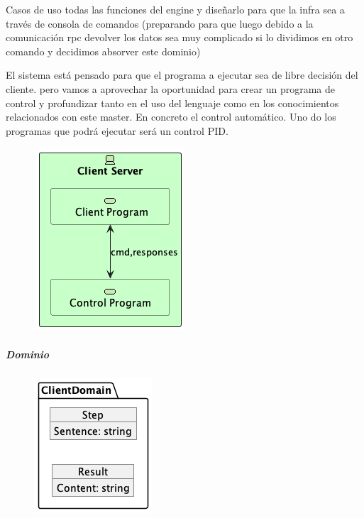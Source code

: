 Casos de uso todas las funciones del engine y diseñarlo para que la infra sea a través de consola de comandos (preparando para que luego debido a la comunicación rpc devolver los datos sea muy complicado si lo dividimos en otro comando y decidimos absorver este dominio)

El sistema está pensado para que el programa a ejecutar sea de libre decisión del cliente. pero vamos a aprovechar la oportunidad para crear un programa de control y profundizar tanto en el uso del lenguaje como en los conocimientos relacionados con este master. En concreto el control automático. Uno do los programas que podrá ejecutar será un control PID.



\begin{figure}[H]
    \centering
    \includegraphics[height=0.3\textheight]{./part/Proyecto_ejecutivo/memoria_descriptiva/descripcionDelProyecto/control/uml/controlConcept}
    \caption[Diagrama componentes]{}\label{fig:controlConcept}
\end{figure}

\subparagraph{Dominio}

\begin{figure}[H]
    \centering
    \includegraphics[height=0.4\textheight]{./part/Proyecto_ejecutivo/memoria_descriptiva/descripcionDelProyecto/control/uml/controlDomain}
    \caption[Diagrama de objetos de dominio]{}\label{fig:controlDomain}
\end{figure}

